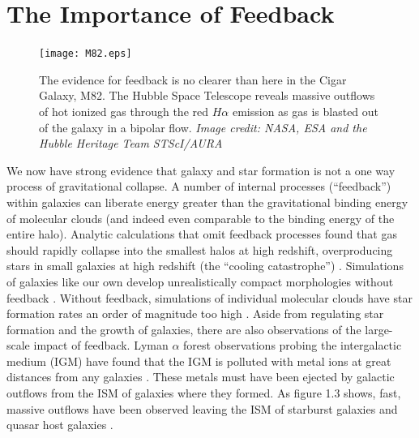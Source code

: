 \section{The Importance of Feedback}
\begin{figure}
    \texttt{[image: M82.eps]}
	\caption[Massive outflows in M82]{The evidence for feedback is no clearer
	than here in the Cigar Galaxy, M82.  The Hubble Space Telescope reveals massive
	outflows of hot ionized gas through the red $H\alpha$ emission as gas is
	blasted out of the galaxy in a bipolar flow. \textit{Image credit: NASA, ESA
	and the Hubble Heritage Team STScI/AURA}}
\end{figure}
We now have strong evidence that galaxy and star formation is not a one way process of
gravitational collapse.  A number of internal processes (``feedback'') within
galaxies can liberate energy greater than the gravitational binding energy of
molecular clouds (and indeed even comparable to the binding energy of the entire
halo).  Analytic calculations that omit feedback processes found that gas should
rapidly collapse into the smallest halos at high redshift, overproducing
stars in small galaxies at high redshift (the ``cooling catastrophe'')
\citep{Cole2001,Benson2003}.  Simulations of galaxies like our own develop unrealistically
compact morphologies without feedback \citep{Stinson2006}.  Without feedback, simulations of
individual molecular clouds have star formation rates an order of magnitude
too high \citep{Agertz2013}.  Aside from regulating star formation and the
growth of galaxies, there are also observations of the large-scale impact of
feedback. Lyman $\alpha$ forest observations probing the intergalactic medium
(IGM) have found that the IGM is polluted with metal ions at great distances
from any galaxies \citep{Sargent1988,Songaila1996,Dave1998}.  These metals must have
been ejected by galactic outflows from the ISM of galaxies where they formed.
As figure 1.3 shows, fast, massive outflows have been observed leaving the ISM of
starburst galaxies and quasar host galaxies \citep{Veilleux2005,Werk2014}.

